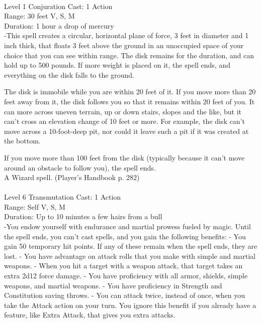 \documentclass[10pt,twocolumn]{report}
\begin{document}
 \\
Level 1 \quad Conjuration \quad Cast: 1 Action\\
Range: 30 feet \quad V, S, M\\
Duration: 1 hour \quad a drop of mercury\\
-This spell creates a circular, horizontal plane of force, 3 feet in diameter and 1 inch thick, that floats 3 feet above the ground in an unoccupied space of your choice that you can see within range.
The disk remains for the duration, and can hold up to 500 pounds. If more weight is placed on it, the spell ends, and everything on the disk falls to the ground.

The disk is immobile while you are within 20 feet of it. If you move more than 20 feet away from it, the disk follows you so that it remains within 20 feet of you. It can more across uneven terrain, up or down stairs, slopes and the like, but it can’t cross an elevation change of 10 feet or more. For example, the disk can’t move across a 10-foot-deep pit, nor could it leave such a pit if it was created at the bottom.

If you move more than 100 feet from the disk (typically because it can’t move around an obstacle to follow you), the spell ends.\\
A Wizard spell. (Player's Handbook p. 282) \\


 \\
Level 6 \quad Transmutation \quad Cast: 1 Action\\
Range: Self \quad V, S, M\\
Duration: Up to 10 minutes \quad a few hairs from a bull\\
-You endow yourself with endurance and martial prowess fueled by magic. Until the spell ends, you can’t cast spells, and you gain the following benefits:
- You gain 50 temporary hit points. If any of these remain when the spell ends, they are lost.
- You have advantage on attack rolls that you make with simple and martial weapons.
- When you hit a target with a weapon attack, that target takes an extra 2d12 force
damage.
- You have proficiency with all armor, shields, simple weapons, and martial weapons.
- You have proficiency in Strength and Constitution saving throws.
- You can attack twice, instead of once, when you take the Attack action on your turn. You ignore this benefit if you already have a feature, like Extra Attack, that gives you extra attacks.
\end{document}
